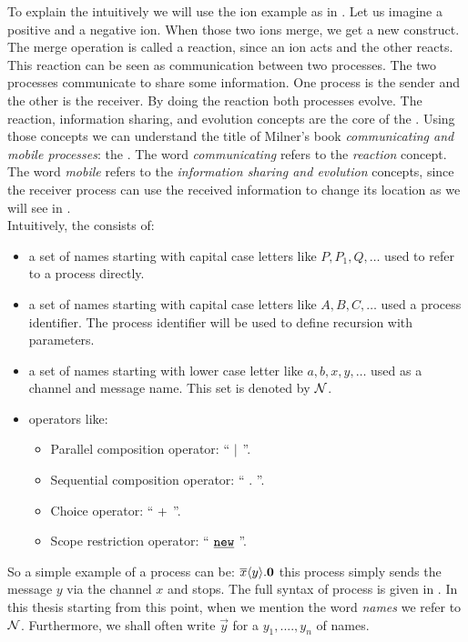 To explain the \picalc{} intuitively we will use the ion example as in \cite{milner}. Let us imagine a positive and a negative ion. When those two ions merge, we get a new construct. The merge operation is called a reaction, since an ion acts and the other reacts. This reaction can be seen as communication between two processes. The two processes communicate to share some information.  One process is the sender and the other is the receiver. By doing the reaction both processes evolve. The reaction, information sharing, and evolution concepts are the core of the \picalc{}. Using those concepts we can understand the title of Milner's book \textit{communicating and mobile processes}: the \picalc{} \cite{milner}. The word \textit{communicating} refers to the \textit{reaction} concept. The word \textit{mobile} refers to the \textit{information sharing and evolution} concepts, since the receiver process can use the received information to change its location as we will see in .
\\Intuitively, the \picalc{} consists of: 
\begin{itemize}
\item a set of names starting with capital case letters  like $P, P_1, Q,\dots$  used to refer to a process directly.
\item a set of names starting with capital case letters  like $A, B, C,\dots$  used a process identifier. The process identifier will be used to define recursion with parameters.
\item a set of names starting with lower case letter like $a, b, x, y,\dots$  used as a channel and message name. This set is denoted by $\mathcal N$.
\item operators like:
	\begin{itemize}
	\item  Parallel composition operator: `` $\mid$ ''.
	\item  Sequential composition operator: `` $.$ ''.
	\item  Choice operator: `` $+$ ''.
	\item  Scope restriction operator: `` $\procres{}{}$ ''.
	\end{itemize}
\end{itemize}
So a simple example of a process can be: $\overline{x}\langle y\rangle.\mathbf{0}$ this process simply sends the message $y$ via the channel $x$ and stops.
The full syntax of \picalc{} process is given in . In this thesis starting from this point, when we mention the word \textit{names} we refer to $\mathcal N$. Furthermore, we shall often write $\vec{y}$ for a  $y_1,....,y_n$ of names.
